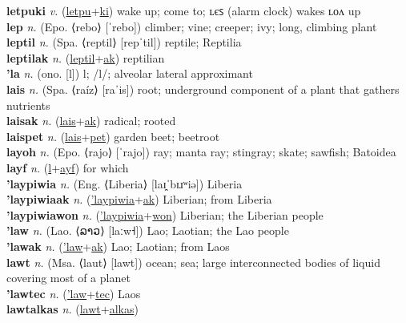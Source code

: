 \textbf{letpuki} \textit{v.} (\hyperref[letpu]{letpu}+\hyperref[ki]{ki})
wake up; come to; ʟєꜱ (alarm clock) wakes ʟᴏᴧ up \label{letpuki} \\
\textbf{lep} \textit{n.} (Epo. ⟨rebo⟩ [ˈrebo])
climber; vine; creeper; ivy; long, climbing plant \label{lep} \\
\textbf{leptil} \textit{n.} (Spa. ⟨reptil⟩ [repˈtil])
reptile; Reptilia \label{leptil} \\
\textbf{leptilak} \textit{n.} (\hyperref[leptil]{leptil}+\hyperref[ak]{ak})
reptilian \label{leptilak} \\
\textbf{'la} \textit{n.} (ono. [l])
l; /l/; alveolar lateral approximant \label{'la} \\
\textbf{lais} \textit{n.} (Spa. ⟨raíz⟩ [raˈis])
root; underground component of a plant that gathers nutrients \label{lais} \\
\textbf{laisak} \textit{n.} (\hyperref[lais]{lais}+\hyperref[ak]{ak})
radical; rooted \label{laisak} \\
\textbf{laispet} \textit{n.} (\hyperref[lais]{lais}+\hyperref[pet]{pet})
garden beet; beetroot \label{laispet} \\
\textbf{layoh} \textit{n.} (Epo. ⟨rajo⟩ [ˈrajo])
ray; manta ray; stingray; skate; sawfish; Batoidea \label{layoh} \\
\textbf{layf} \textit{n.} (\hyperref[l]{l}+\hyperref[ayf]{ayf})
for which \label{layf} \\
\textbf{'laypiwia} \textit{n.} (Eng. ⟨Liberia⟩ [laɪ̯ˈbɪɹʷiə])
Liberia \label{'laypiwia} \\
\textbf{'laypiwiaak} \textit{n.} (\hyperref['laypiwia]{'laypiwia}+\hyperref[ak]{ak})
Liberian; from Liberia \label{'laypiwiaak} \\
\textbf{'laypiwiawon} \textit{n.} (\hyperref['laypiwia]{'laypiwia}+\hyperref[won]{won})
Liberian; the Liberian people \label{'laypiwiawon} \\
\textbf{'law} \textit{n.} (Lao. ⟨ລາວ⟩ [laːw˧])
Lao; Laotian; the Lao people \label{'law} \\
\textbf{'lawak} \textit{n.} (\hyperref['law]{'law}+\hyperref[ak]{ak})
Lao; Laotian; from Laos \label{'lawak} \\
\textbf{lawt} \textit{n.} (Msa. ⟨laut⟩ [lawt])
ocean; sea; large interconnected bodies of liquid covering most of a planet \label{lawt} \\
\textbf{'lawtec} \textit{n.} (\hyperref['law]{'law}+\hyperref[tec]{tec})
Laos \label{'lawtec} \\
\textbf{lawtalkas} \textit{n.} (\hyperref[lawt]{lawt}+\hyperref[alkas]{alkas})
